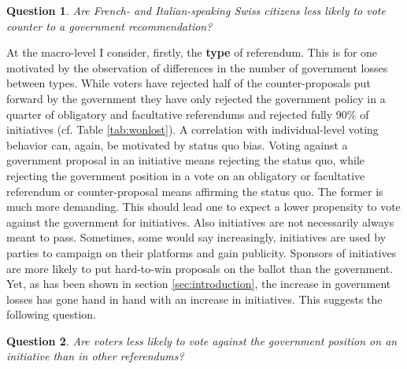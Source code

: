 \documentclass[11pt,a4paper]{article}\usepackage[]{graphicx}\usepackage[]{color}
\newtheorem{question}{Question}
\begin{document}
    \begin{question}
	    \begin{minipage}[t]{4 in}
	        Are French- and Italian-speaking Swiss citizens less likely to vote counter to a government recommendation?
	    \end{minipage}
    \end{question} 
    
    At the macro-level I consider, firstly, the \textbf{type} of referendum. This is for one motivated by the observation of differences in the number of government losses between types. While voters have rejected half of the counter-proposals put forward by the government they have only rejected the government policy in a quarter of obligatory and facultative referendums and rejected fully 90\% of initiatives (cf. Table \ref{tab:wonlost}). A correlation with individual-level voting behavior can, again, be motivated by status quo bias. Voting against a government proposal in an initiative means rejecting the status quo, while rejecting the government position in a vote on an obligatory or facultative referendum or counter-proposal means affirming the status quo. The former is much more demanding. This should lead one to expect a lower propensity to vote against the government for initiatives. 
    Also initiatives are not necessarily always meant to pass. Sometimes, some would say increasingly, initiatives are used by parties to campaign on their platforms and gain publicity. Sponsors of initiatives are more likely to put hard-to-win proposals on the ballot than the government. %
    Yet, as has been shown in section \ref{sec:introduction}, the increase in government losses has gone hand in hand with an increase in initiatives. This suggests the following question.
    
     \begin{question}
    	\begin{minipage}[t]{4 in}
    		Are voters less likely to vote against the government position on an initiative than in other referendums?
    	\end{minipage}
     \end{question}
     
    	
\end{document}
